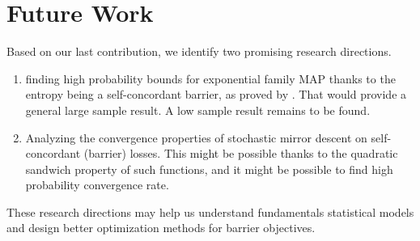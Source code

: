 \section{Future Work}
Based on our last contribution, we identify two promising research directions.
\begin{enumerate}
	\item finding high probability bounds for exponential family MAP thanks to the entropy being a self-concordant barrier, as proved by \citep{bubeck2015entropic}.
	That would provide a general large sample result. A low sample result remains to be found.
	\item Analyzing the convergence properties of stochastic mirror descent on self-concordant (barrier) losses. This might be possible thanks to the quadratic sandwich property of such functions, and it might be possible to find high probability convergence rate. 
\end{enumerate}
These research directions may help us understand fundamentals statistical models and design better optimization methods for barrier objectives.